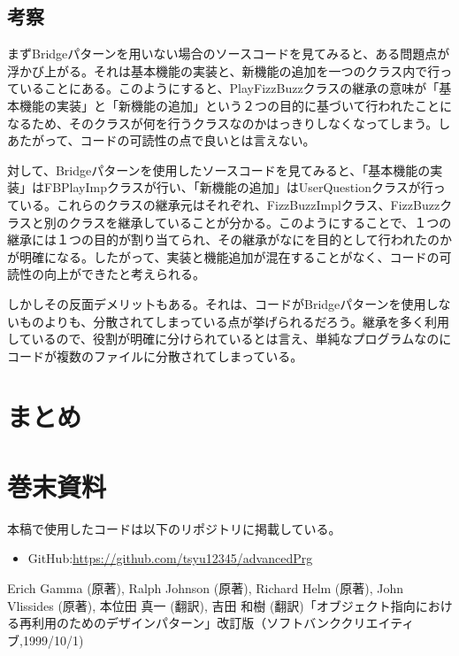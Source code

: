 \documentclass[dvipdfmx]{jsarticle}
\begin{document}
\subsection{考察}
まずBridgeパターンを用いない場合のソースコードを見てみると、ある問題点が浮かび上がる。それは基本機能の実装と、新機能の追加を一つのクラス内で行っていることにある。このようにすると、PlayFizzBuzzクラスの継承の意味が「基本機能の実装」と「新機能の追加」という２つの目的に基づいて行われたことになるため、そのクラスが何を行うクラスなのかはっきりしなくなってしまう。しあたがって、コードの可読性の点で良いとは言えない。\par
対して、Bridgeパターンを使用したソースコードを見てみると、「基本機能の実装」はFBPlayImpクラスが行い、「新機能の追加」はUserQuestionクラスが行っている。これらのクラスの継承元はそれぞれ、FizzBuzzImplクラス、FizzBuzzクラスと別のクラスを継承していることが分かる。このようにすることで、１つの継承には１つの目的が割り当てられ、その継承がなにを目的として行われたのかが明確になる。したがって、実装と機能追加が混在することがなく、コードの可読性の向上ができたと考えられる。\par
しかしその反面デメリッ卜もある。それは、コードがBridgeパターンを使用しないものよりも、分散されてしまっている点が挙げられるだろう。継承を多く利用しているので、役割が明確に分けられているとは言え、単純なプログラムなのにコードが複数のファイルに分散されてしまっている。

\section{まとめ}
\section{巻末資料}
本稿で使用したコードは以下のリポジトリに掲載している。
\begin{itemize}
  \item GitHub:\url{https://github.com/tsyu12345/advancedPrg}
\end{itemize}
\begin{thebibliography}{99}
    Erich Gamma (原著), Ralph Johnson (原著), Richard Helm (原著), John Vlissides (原著), 本位田 真一 (翻訳), 吉田 和樹 (翻訳)「オブジェクト指向における再利用のためのデザインパターン」改訂版（ソフトバンククリエイティブ,1999/10/1)
\end{thebibliography}
\end{document}
